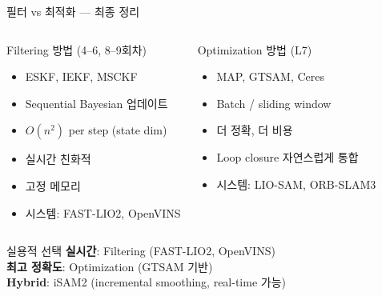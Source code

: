 \begin{frame}{필터 vs 최적화 — 최종 정리}
  \begin{columns}
    \begin{block}{Filtering 방법 (4--6, 8--9회차)}
      \begin{itemize}
        \item ESKF, IEKF, MSCKF
        \item Sequential Bayesian 업데이트
        \item $O(n^2)$ per step (state dim)
        \item 실시간 친화적
        \item 고정 메모리
        \item 시스템: FAST-LIO2, OpenVINS
      \end{itemize}
    \end{block}
    \begin{block}{Optimization 방법 (L7)}
      \begin{itemize}
        \item MAP, GTSAM, Ceres
        \item Batch / sliding window
        \item 더 정확, 더 비용
        \item Loop closure 자연스럽게 통합
        \item 시스템: LIO-SAM, ORB-SLAM3
      \end{itemize}
    \end{block}
  \end{columns}
  \pause
  \begin{exampleblock}{실용적 선택}
    \textbf{실시간}: Filtering (FAST-LIO2, OpenVINS)\\
    \textbf{최고 정확도}: Optimization (GTSAM 기반)\\
    \textbf{Hybrid}: iSAM2 (incremental smoothing, real-time 가능)
  \end{exampleblock}
\end{frame}


